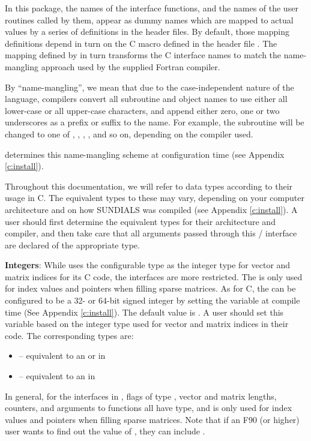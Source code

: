 
In this package, the names of the interface functions, and the names
of the {\F} user routines called by them, appear as dummy names
which are mapped to actual values by a series of definitions in the
header files.  By default, those mapping definitions depend in turn
on the C macro  defined in the header file
.  
The mapping defined by  in turn
transforms the C interface names to match the name-mangling approach
used by the supplied Fortran compiler.

By ``name-mangling'', we mean that due to the case-independent nature of
the {\F} language, {\F} compilers convert all subroutine and
object names to use either all lower-case or all upper-case
characters, and append either zero, one or two underscores as a prefix
or suffix to the name.  For example, the {\F} subroutine
 will be changed to one of ,
, , , and so on,
depending on the {\F} compiler used.

{\sundials} determines this name-mangling scheme at configuration time
(see Appendix \ref{c:install}).

\label{ss:fcdata}
Throughout this documentation, we will refer to data types according
to their usage in C.  The equivalent types to these may vary,
depending on your computer architecture and on how SUNDIALS was
compiled (see Appendix \ref{c:install}).  A {\F} user should first
determine the equivalent types for their architecture and compiler,
and then take care that all arguments passed through this {\F}/{\CC}
interface are declared of the appropriate type.

\textbf{Integers}: While {\sundials} uses the configurable 
 type as the
integer type for vector and matrix indices for its C code,
the {\F} interfaces are more restricted.  The  
is only used for index values and pointers when filling sparse matrices.
As for C, the  can
be configured to be a 32- or 64-bit signed integer by setting the variable
 at compile time (See Appendix \ref{c:install}).
The default value is .
A {\F} user should set this variable based on the integer type used for
vector and matrix indices in their {\F} code. The corresponding {\F}
types are:

\begin{itemize}
\item {} 
 -- equivalent to an  or  in {\F}

\item {} 
 -- equivalent to an  in {\F}
\end{itemize}
In general, for the {\F} interfaces in {\sundials}, flags of type ,
vector and matrix lengths, counters, and arguments to  functions
all have  type, and  
is only used for index values and pointers when filling sparse matrices.
Note that if an F90 (or higher) user wants to find out the value of ,
they can include .


